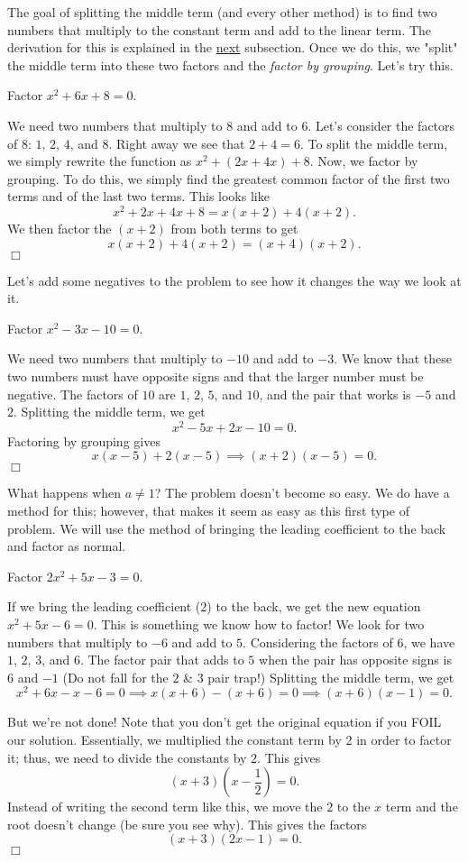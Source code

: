 \documentclass[../book.tex]{subfiles}
\begin{document}
The goal of splitting the middle term (and every other method) is to find two numbers that multiply to the constant term and add to the linear term.  The derivation for this is explained in the \hyperlink{section.5.5.2}{next} subsection.  Once we do this, we "split" the middle term into these two factors and the \textit{factor by grouping}.  Let's try this.
\begin{example}
Factor $x^2+6x+8=0$.
\end{example}
\begin{solution}
We need two numbers that multiply to $8$ and add to $6$.  Let's consider the factors of $8$: $1$, $2$, $4$, and $8$.  Right away we see that $2+4=6$.  To split the middle term, we simply rewrite the function as $x^2+\left(2x+4x\right)+8$.  Now, we factor by grouping.  To do this, we simply find the greatest common factor of the first two terms and of the last two terms.  This looks like $$x^2+2x+4x+8=x(x+2)+4(x+2).$$  We then factor the $(x+2)$ from both terms to get $$x(x+2)+4(x+2)=(x+4)(x+2).$$ $\Box$
\end{solution}
Let's add some negatives to the problem to see how it changes the way we look at it.
\begin{example}
Factor $x^2-3x-10=0$.
\end{example}
\begin{solution}
We need two numbers that multiply to $-10$ and add to $-3$.  We know that these two numbers must have opposite signs and that the larger number must be negative.  The factors of $10$ are $1$, $2$, $5$, and $10$, and the pair that works is $-5$ and $2$.  Splitting the middle term, we get $$x^2-5x+2x-10=0.$$  Factoring by grouping gives $$x(x-5)+2(x-5) \implies (x+2)(x-5)=0.$$ $\Box$
\end{solution}
What happens when $a\neq 1$?  The problem doesn't become so easy.  We do have a method for this; however, that makes it seem as easy as this first type of problem.  We will use the method of bringing the leading coefficient to the back and factor as normal.
\begin{example}
Factor $2x^2+5x-3=0$.
\end{example}
\begin{solution}
If we bring the leading coefficient ($2$) to the back, we get the new equation $x^2+5x-6=0$.  This is something we know how to factor!  We look for two numbers that multiply to $-6$ and add to $5$.  Considering the factors of $6$, we have $1$, $2$, $3$, and $6$.  The factor pair that adds to $5$ when the pair has opposite signs is $6$ and $-1$ (Do not fall for the $2$ \& $3$ pair trap!)  Splitting the middle term, we get $$x^2+6x-x-6=0 \implies x(x+6)-(x+6)=0 \implies (x+6)(x-1)=0.$$  

But we're not done!  Note that you don't get the original equation if you FOIL our solution.  Essentially, we multiplied the constant term by 2 in order to factor it; thus, we need to divide the constants by $2$.  This gives $$\left(x+3\right)\left(x-\dfrac{1}{2}\right)=0.$$  Instead of writing the second term like this, we move the $2$ to the $x$ term and the root doesn't change (be sure you see why).  This gives the factors $$(x+3)(2x-1)=0.$$ $\Box$
\end{solution}
\end{document}

